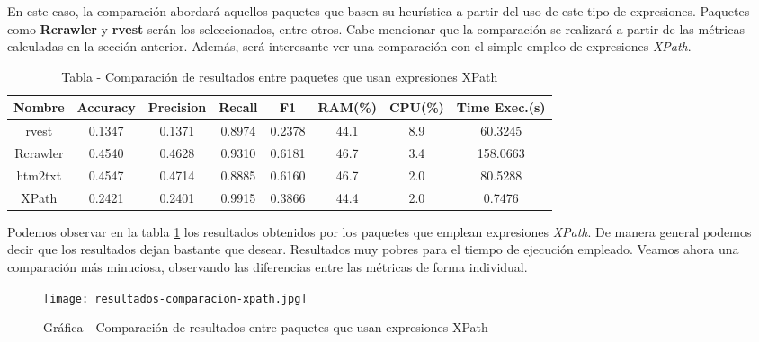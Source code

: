 En este caso, la comparación abordará aquellos paquetes que basen su heurística a partir del uso de este
tipo de expresiones. Paquetes como \textbf{Rcrawler} y \textbf{rvest} serán los seleccionados, entre otros.
Cabe mencionar que la comparación se realizará a partir de las métricas calculadas en la sección anterior.
Además, será interesante ver una comparación con el simple empleo de expresiones \emph{XPath}.

\begin{table}[h]
    \begin{center}
      \begin{tabular}{| c | c | c | c | c | c | c | c |} \hline 
       \textbf{Nombre} & \textbf{Accuracy} & \textbf{Precision}  & \textbf{Recall} & \textbf{F1} & \textbf{RAM(\%)} & \textbf{CPU(\%)} & \textbf{Time Exec.(s)} \\ \hline
       rvest & 0.1347 & 0.1371 & 0.8974 & 0.2378 & 44.1 & 8.9 & 60.3245 \\ \hline
       Rcrawler & 0.4540 & 0.4628 & 0.9310 & 0.6181 & 46.7 & 3.4 & 158.0663 \\ \hline
       htm2txt & 0.4547 & 0.4714 & 0.8885 & 0.6160 & 46.7 & 2.0 & 80.5288 \\ \hline
       XPath & 0.2421 & 0.2401 & 0.9915 & 0.3866 & 44.4 & 2.0 & 0.7476 \\ \hline
      \end{tabular}
      \caption{Tabla - Comparación de resultados entre paquetes que usan expresiones XPath}
      \label{tab:tabla - comparacion de resultados entre paquetes que usan expresiones xpath}
    \end{center}
\end{table}

Podemos observar en la tabla \ref{tab:tabla - comparacion de resultados entre paquetes que usan expresiones xpath} los
resultados obtenidos por los paquetes que emplean expresiones \emph{XPath}. De manera general podemos decir
que los resultados dejan bastante que desear. Resultados muy pobres para el tiempo de ejecución empleado.
Veamos ahora una comparación más minuciosa, observando las diferencias entre las métricas de forma individual.

\begin{figure}[tphb]
    \centering
    \texttt{[image: resultados-comparacion-xpath.jpg]}
    \caption{Gráfica - Comparación de resultados entre paquetes que usan expresiones XPath}
    \label{img:grafica - comparacion de resultados entre paquetes que usan expresiones xpath}
\end{figure}

